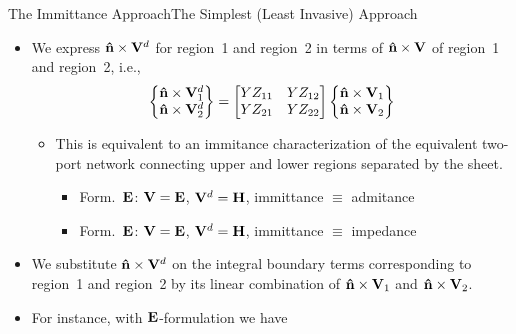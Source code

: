 
\begin{frame}[allowframebreaks]{The Immittance Approach}{The Simplest (Least Invasive)
    Approach}
  
  \begin{itemize}\setlength{\itemsep}{0.3\baselineskip}
  \item We express $\mathbf{\hat{n}}\times\mathbf{V}^d$ for region~1 and region~2 in terms of 
    $\mathbf{\hat{n}}\times\mathbf{V}$ of region~1 and region~2, i.e.,
    \begin{equation*}
      \begin{Bmatrix}
        \mathbf{\hat{n}}\times\mathbf{V}^d_1 \\ \mathbf{\hat{n}}\times\mathbf{V}^d_2
      \end{Bmatrix} =
      \begin{bmatrix}
        YZ_{11} & YZ_{12} \\ YZ_{21}  & YZ_{22}
      \end{bmatrix}
      \begin{Bmatrix}
        \mathbf{\hat{n}}\times\mathbf{V}_1 \\ \mathbf{\hat{n}}\times\mathbf{V}_2
      \end{Bmatrix} 
    \end{equation*}

    \begin{itemize}
    \item  This is equivalent to an immitance characterization of
      the equivalent two-port network connecting upper and lower
      regions separated by the sheet.
      \begin{itemize}
      \item Form.\ $\mathbf{E}$: $\mathbf{V}=\mathbf{E}$, $\mathbf{V}^d=\mathbf{H}$, immittance $\equiv$ admitance 
      \item Form.\ $\mathbf{E}$: $\mathbf{V}=\mathbf{E}$, $\mathbf{V}^d=\mathbf{H}$, immittance $\equiv$ impedance 
      \end{itemize}
    \end{itemize}

  \item We substitute $\mathbf{\hat{n}}\times\mathbf{V}^d$ on the integral boundary
    terms corresponding to region~1 and region~2 by its linear
    combination of $\mathbf{\hat{n}}\times\mathbf{V}_1$ and $\mathbf{\hat{n}}\times\mathbf{V}_2$.

    \framebreak  %
    
  \item For instance, with $\mathbf{E}$-formulation we have


\end{itemize}
\end{frame}
